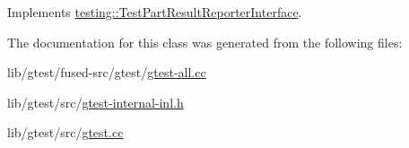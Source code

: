 Implements \hyperlink{classtesting_1_1_test_part_result_reporter_interface_aa2f920e7a5a0a6d0faf19e3727928c22}{testing\-::\-Test\-Part\-Result\-Reporter\-Interface}.



The documentation for this class was generated from the following files\-:\begin{DoxyCompactItemize}
\item 
lib/gtest/fused-\/src/gtest/\hyperlink{fused-src_2gtest_2gtest-all_8cc}{gtest-\/all.\-cc}\item 
lib/gtest/src/\hyperlink{gtest-internal-inl_8h}{gtest-\/internal-\/inl.\-h}\item 
lib/gtest/src/\hyperlink{gtest_8cc}{gtest.\-cc}\end{DoxyCompactItemize}
